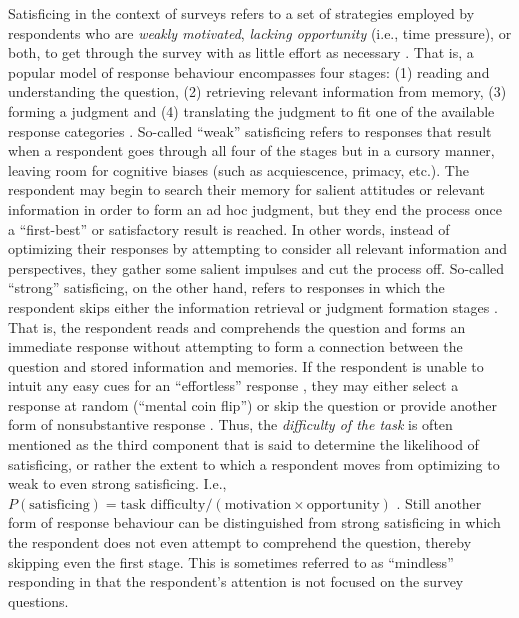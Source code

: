 \documentclass[Royal,times,sageh]{sagej}
\begin{document}
Satisficing \citep{Krosnick1991, Roberts2019} in the context of surveys
refers to a set of strategies employed by respondents who are
\emph{weakly motivated}, \emph{lacking opportunity} (i.e., time
pressure), or both, to get through the survey with as little effort as
necessary \citep{Krosnick1991, Roberts2019}. That is, a popular model of
response behaviour encompasses four stages: (1) reading and
understanding the question, (2) retrieving relevant information from
memory, (3) forming a judgment and (4) translating the judgment to fit
one of the available response categories
\citep{Roberts2019, Tourangeau2000}. So-called ``weak'' satisficing
refers to responses that result when a respondent goes through all four
of the stages but in a cursory manner, leaving room for cognitive biases
(such as acquiescence, primacy, etc.). The respondent may begin to
search their memory for salient attitudes or relevant information in
order to form an ad hoc judgment, but they end the process once a
``first-best'' or satisfactory result is reached. In other words,
instead of optimizing their responses by attempting to consider all
relevant information and perspectives, they gather some salient impulses
and cut the process off. So-called ``strong'' satisficing, on the other
hand, refers to responses in which the respondent skips either the
information retrieval or judgment formation stages \citep{Vannette2014}.
That is, the respondent reads and comprehends the question and forms an
immediate response without attempting to form a connection between the
question and stored information and memories. If the respondent is
unable to intuit any easy cues for an ``effortless'' response
\citep{Roberts2019, Leiner2019}, they may either select a response at
random (``mental coin flip'') or skip the question or provide another
form of nonsubstantive response \citep[e.g., ``don't
know'',][]{Vannette2014}. Thus, the \emph{difficulty of the task} is
often mentioned as the third component that is said to determine the
likelihood of satisficing, or rather the extent to which a respondent
moves from optimizing to weak to even strong satisficing. I.e.,
\(P(\text{satisficing}) = \text{task difficulty}/(\text{motivation} \times \text{opportunity})\)
\citep{Roberts2019}. Still another form of response behaviour can be
distinguished from strong satisficing in which the respondent does not
even attempt to comprehend the question, thereby skipping even the first
stage. This is sometimes referred to as ``mindless'' responding
\citep{Vannette2014} in that the respondent's attention is not focused
on the survey questions.
\end{document}
